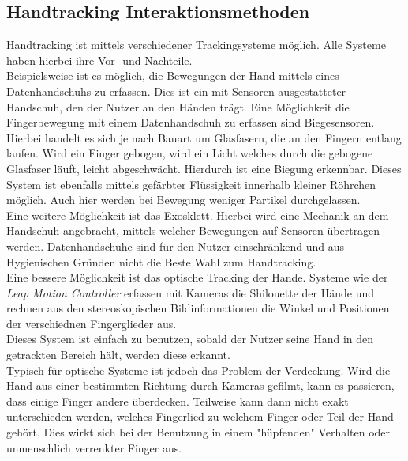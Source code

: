 \subsection{Handtracking Interaktionsmethoden}\label{sec:HandtrackingAnwendungen}
Handtracking ist mittels verschiedener Trackingsysteme möglich. Alle Systeme haben hierbei ihre Vor- und Nachteile. \\
Beispielsweise ist es möglich, die Bewegungen der Hand mittels eines Datenhandschuhs zu erfassen. Dies ist ein mit Sensoren ausgestatteter Handschuh, den der Nutzer an den Händen trägt. Eine Möglichkeit die Fingerbewegung mit einem Datenhandschuh zu erfassen sind Biegesensoren. Hierbei handelt es sich je nach Bauart um Glasfasern, die an den Fingern entlang laufen. Wird ein Finger gebogen, wird ein Licht welches durch die gebogene Glasfaser läuft, leicht abgeschwächt. Hierdurch ist eine Biegung erkennbar. Dieses System ist ebenfalls mittels gefärbter Flüssigkeit innerhalb kleiner Röhrchen möglich. Auch hier werden bei Bewegung weniger Partikel durchgelassen.\\
Eine weitere Möglichkeit ist das Exosklett. Hierbei wird eine Mechanik an dem Handschuh angebracht, mittels welcher Bewegungen auf Sensoren übertragen werden. Datenhandschuhe sind für den Nutzer einschränkend und aus Hygienischen Gründen nicht die Beste Wahl zum Handtracking.\\
Eine bessere Möglichkeit ist das optische Tracking der Hande. Systeme wie der \textit{Leap Motion Controller} erfassen mit Kameras die Shilouette der Hände und rechnen aus den stereoskopischen Bildinformationen die Winkel und Positionen der verschiednen Fingerglieder aus.\\
Dieses System ist einfach zu benutzen, sobald der Nutzer seine Hand in den getrackten Bereich hält, werden diese erkannt.\\
Typisch für optische Systeme ist jedoch das Problem der Verdeckung. Wird die Hand aus einer bestimmten Richtung durch Kameras gefilmt, kann es passieren, dass einige Finger andere überdecken. Teilweise kann dann nicht exakt unterschieden werden, welches Fingerlied zu welchem Finger oder Teil der Hand gehört. Dies wirkt sich bei der Benutzung in einem "hüpfenden" Verhalten oder unmenschlich verrenkter Finger aus.



